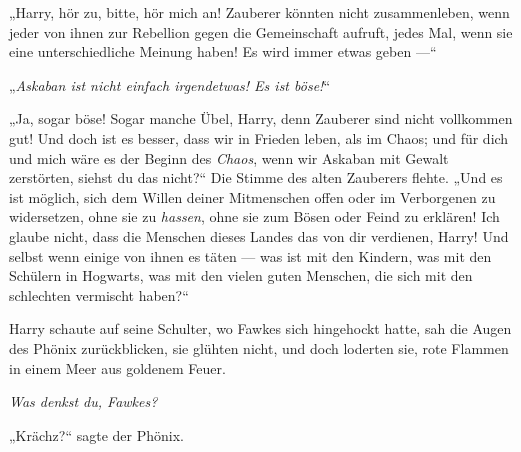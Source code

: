 „Harry, hör zu, bitte, hör mich an! Zauberer könnten nicht zusammenleben, wenn jeder von ihnen zur Rebellion gegen die Gemeinschaft aufruft, jedes Mal, wenn sie eine unterschiedliche Meinung haben! Es wird immer etwas geben —“

„\emph{Askaban ist nicht einfach irgendetwas! Es ist böse!}“

„Ja, sogar böse! Sogar manche Übel, Harry, denn Zauberer sind nicht vollkommen gut! Und doch ist es besser, dass wir in Frieden leben, als im Chaos; und für dich und mich wäre es der Beginn des \emph{Chaos}, wenn wir Askaban mit Gewalt zerstörten, siehst du das nicht?“ Die Stimme des alten Zauberers flehte.
„Und es ist möglich, sich dem Willen deiner Mitmenschen offen oder im Verborgenen zu widersetzen, ohne sie zu \emph{hassen}, ohne sie zum Bösen oder Feind zu erklären! Ich glaube nicht, dass die Menschen dieses Landes das von dir verdienen, Harry! Und selbst wenn einige von ihnen es täten — was ist mit den Kindern, was mit den Schülern in Hogwarts, was mit den vielen guten Menschen, die sich mit den schlechten vermischt haben?“

Harry schaute auf seine Schulter, wo Fawkes sich hingehockt hatte, sah die Augen des Phönix zurückblicken, sie glühten nicht, und doch loderten sie, rote Flammen in einem Meer aus goldenem Feuer.

\emph{Was denkst du, Fawkes?}

„Krächz?“ sagte der Phönix.

